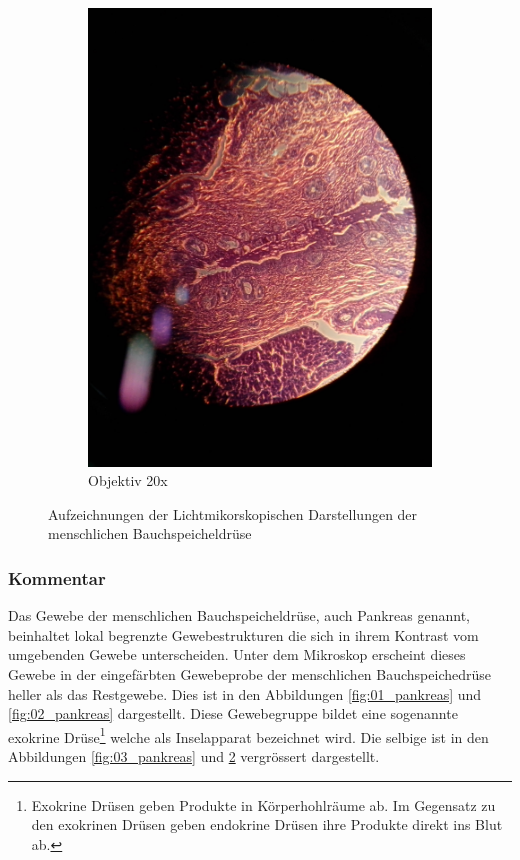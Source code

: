 \begin{figure}[h!]
\begin{subfigure}[b]{0.3\textwidth}
		\includegraphics[width=1\textwidth]{../images/04_pankreas.jpg}
		\caption{Objektiv 20x}
		\label{fig:04_pankreas}
	\end{subfigure}
	\caption{Aufzeichnungen der Lichtmikorskopischen Darstellungen der
		menschlichen Bauchspeicheldrüse}
\end{figure}

\subsubsection{Kommentar}
Das Gewebe der menschlichen Bauchspeicheldrüse, auch Pankreas genannt,
beinhaltet lokal begrenzte Gewebestrukturen die sich in ihrem Kontrast vom
umgebenden Gewebe unterscheiden. Unter dem Mikroskop erscheint dieses Gewebe
in der eingefärbten Gewebeprobe der menschlichen Bauchspeichedrüse heller als
das Restgewebe. Dies ist in den Abbildungen \ref{fig:01_pankreas} und
\ref{fig:02_pankreas} dargestellt. Diese Gewebegruppe bildet eine sogenannte
exokrine Drüse\footnote{Exokrine Drüsen geben Produkte in Körperhohlräume ab.
Im Gegensatz zu den exokrinen Drüsen geben endokrine Drüsen ihre Produkte
direkt ins Blut ab.} welche als Inselapparat bezeichnet wird. Die selbige ist
in den Abbildungen \ref{fig:03_pankreas} und \ref{fig:04_pankreas} vergrössert
dargestellt.

